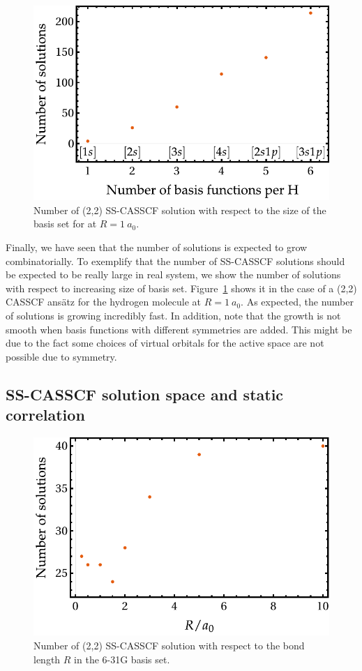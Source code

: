 \documentclass[aip,jcp,reprint,noshowkeys,superscriptaddress]{revtex4-1}
\begin{document}
\begin{figure}
  \includegraphics[width=0.9\linewidth]{Figures/fig_2a.pdf}
  \caption{Number of (2,2) SS-CASSCF solution with respect to the size of the basis set for  at $R=1~a_0$. \label{fig:fig_4}}
\end{figure}

Finally, we have seen that the number of solutions is expected to grow combinatorially.
To exemplify that the number of SS-CASSCF solutions should be expected to be really large in real system, we show the number of solutions with respect to increasing size of basis set.
Figure~\ref{fig:fig_4} shows it in the case of a (2,2) CASSCF ans\"atz for the hydrogen molecule at $R=1~a_0$.
As expected, the number of solutions is growing incredibly fast.
In addition, note that the growth is not smooth when basis functions with different symmetries are added.
This might be due to the fact some choices of virtual orbitals for the active space are not possible due to symmetry.

\subsection{SS-CASSCF solution space and static correlation}
\label{sec:static}

\begin{figure}
  \includegraphics[width=0.9\linewidth]{Figures/fig_2b.pdf}
  \caption{Number of (2,2) SS-CASSCF solution with respect to the  bond length $R$ in the 6-31G basis set. \label{fig:fig_5}}
\end{figure}
\end{document}
